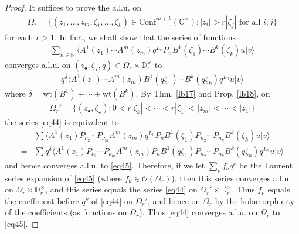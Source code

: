 \documentclass[12pt,b5paper,notitlepage]{article}
\theoremstyle{definition}
\newtheorem{rem}[df]{Remark}
\theoremstyle{plain}
\newcommand{\Conf}{\mathrm{Conf}}
\newcommand{\bk}[1]{\langle {#1}\rangle}
\newcommand{\scr}{\mathscr}
\newcommand{\blt}{\bullet}
\newcommand{\Cbb}{\mathbb C}
\newcommand{\Nbb}{\mathbb N}
\newcommand{\Pbb}{\mathbb P}
\newcommand{\Dbb}{\mathbb D}
\newcommand{\wt}{\mathrm{wt}}
\numberwithin{equation}{section}
\begin{document}
\begin{proof}
It suffices to prove the a.l.u. on
\begin{align*}
\Omega_r=\{(z_1,\dots,z_m,\zeta_1,\dots,\zeta_k)\in\Conf^{m+k}(\Cbb^{\times}):|z_i|>r|\zeta_j|\text{ for all }i,j\}
\end{align*}
for each $r>1$. In fact, we shall show that the series of functions
\begin{align*}
\sum_{n\in\Nbb} \bk{A^1(z_1)\cdots A^m(z_m)q^{L_0}P_nB^1(\zeta_1)\cdots B^k(\zeta_k)u|v}  \tag{a}\label{eq44}
\end{align*}
converges a.l.u. on $(z_\blt,\zeta_\star,q)\in \Omega_r\times \Dbb_r^\times$ to
\begin{align*}
q^\delta\bk{A^1(z_1)\cdots A^m(z_m)B^1(q\zeta_1)\cdots B^k(q\zeta_k)q^{L_0}u|v}  \tag{b}\label{eq45}
\end{align*}
where $\delta=\wt(B^1)+\cdots+\wt(B^k)$. By Thm. \ref{lb17} and Prop. \ref{lb18}, on
\begin{align*}
\Omega_r'=\{(z_\blt,\zeta_\star):0<r|\zeta_k|<\cdots<r|\zeta_1|<|z_m|<\cdots<|z_1|\}
\end{align*}
the series \eqref{eq44} is equivalent to
\begin{align*}
&\sum \bk{A^1(z_1)P_{\nu_2}\cdots P_{\nu_m}A^m(z_m)q^{L_0}P_nB^1(\zeta_1)P_{n_2}\cdots P_{n_k}B^k(\zeta_k)u|v}\\
=&\sum q^\delta\bk{A^1(z_1)P_{\nu_2}\cdots P_{\nu_m}A^m(z_m)P_nB^1(q\zeta_1)P_{n_2}\cdots P_{n_k}B^k(q\zeta_k)q^{L_0}u|v}
\end{align*}
and hence converges a.l.u. to \eqref{eq45}. Therefore, if we let $\sum_\nu f_\nu q^\nu$ be the Laurent series expansion of \eqref{eq45} (where $f_\nu\in\scr O(\Omega_r)$), then this series converges a.l.u. on $\Omega_r\times\Dbb_r^\times$, and this series equals the series \eqref{eq44} on $\Omega_r'\times\Dbb_r^\times$. Thus $f_\nu$ equals the coefficient before $q^\nu$ of \eqref{eq44} on $\Omega_r'$, and hence on $\Omega_r$ by the holomorphicity of the coefficients (as functions on $\Omega_r$). Thus \eqref{eq44} converges a.l.u. on $\Omega_r$ to \eqref{eq45}.
\end{proof}

\begin{comment}
\begin{rem}
In Thm. \ref{lb22}, assume more over that $u$ is vacuum to $B^1,\dots,B^k$, and $v$ is vacuum to $(A^1)^\theta,\dots,(A^k)^\theta$. Let
\begin{align*}
\Gamma=\{(z_\blt,\zeta_\star)\in \Conf^{m+k}(\Pbb^1):z_i\neq0,\zeta_j\neq \infty\text{ for all }i,j\}
\end{align*}
Then by the proof of Thm. \ref{lb17}, one sees that the holomorphic function
\begin{gather*}
(z_\blt,\zeta_\star)\in\Conf^{m+k}(\Cbb^\times)\mapsto\\ (-z_1^2)^{\wt(A^1)}\cdots(-z_m^2)^{\wt(A^m)}\bk{A^1(z_1)\cdots A^m(z_m)B^1(\zeta_1)\cdots B^k(\zeta_k)u|v}
\end{gather*}
can be extended to a holomorphic function on $\Gamma$. 
\end{rem}
\end{comment}
\end{document}
